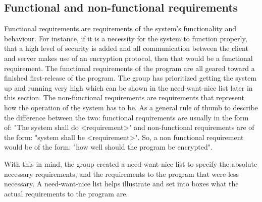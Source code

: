 \subsection{Functional and non-functional requirements}

Functional requirements are requirements of the system's functionality and behaviour. For instance, if it is a necessity for the system to function properly, that a high level of security is added and all communication between the client and server makes use of an encryption protocol, then that would be a functional requirement\cite{SEF01}.
The functional requirements of the program are all geared toward a finished first-release of the program. The group has prioritized getting the system up and running very high which can be shown in the need-want-nice list later in this section. 
The non-functional requirements are requirements that represent how the operation of the system has to be. 
As a general rule of thumb to describe the difference between the two: functional requirements are usually in the form of: "The system shall do <requirement>" and non-functional requirements are of the form: "system shall be <requirement>". So, a non functional requirement would be of the form: "how well should the program be encrypted".

With this in mind, the group created a need-want-nice list to specify the absolute necessary requirements, and the requirements to the program that were less necessary. A need-want-nice list helps illustrate and set into boxes what the actual requirements to the program are.






